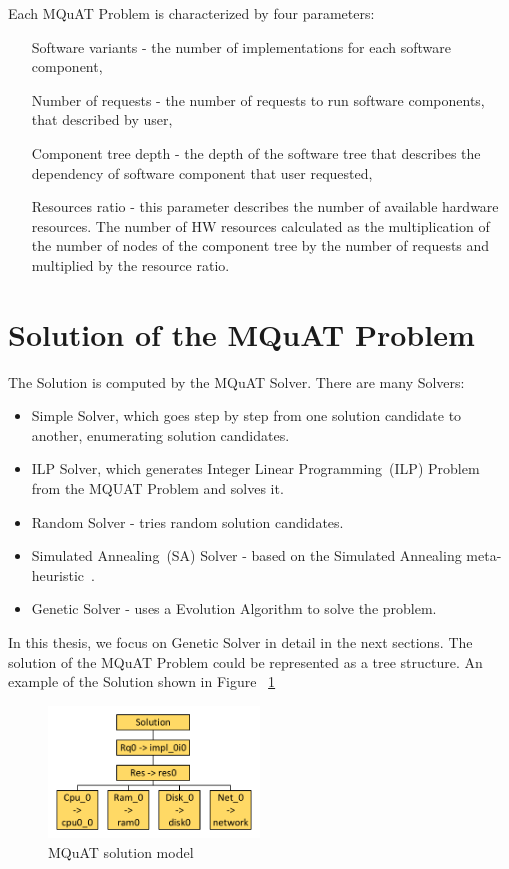 Each MQuAT Problem is characterized by four parameters:

\begin{itemize}
	\item[Software variants] - the number of implementations for each software component,
	\item[Number of requests] - the number of requests to run software components, that described by user, 
	\item[Component tree depth] - the depth of the software tree that describes the dependency of software component that user requested,
	\item[Resources ratio] - this parameter describes the number of available hardware resources. The number of HW resources calculated as the multiplication of the number of nodes of the component tree by the number of requests and multiplied by the resource ratio.
\end{itemize}

\section{Solution of the MQuAT Problem}

The Solution is computed by the MQuAT Solver. There are many Solvers:

\begin{itemize}
	\item Simple Solver, which goes step by step from one solution candidate to another, enumerating solution candidates.
	\item ILP Solver, which generates Integer Linear Programming~(ILP) Problem from the MQUAT Problem and solves it.
	\item Random Solver - tries random solution candidates.
	\item Simulated Annealing~(SA) Solver - based on the Simulated Annealing meta-heuristic~\cite{pukhkaiev19}.
	\item Genetic Solver - uses a Evolution Algorithm to solve the problem.
\end{itemize}

In this thesis, we focus on Genetic Solver in detail in the next sections.
The solution of the MQuAT Problem could be represented as a tree structure. An example of the Solution shown in Figure ~\ref{fig:SolutionModel}

\begin{figure}
	\centering
	\includegraphics[width=0.5\textwidth]{images/MQuATSolutionModel.pdf}
	\caption[MQuAT solution model]{MQuAT solution model}
	\label{fig:SolutionModel}
\end{figure}

